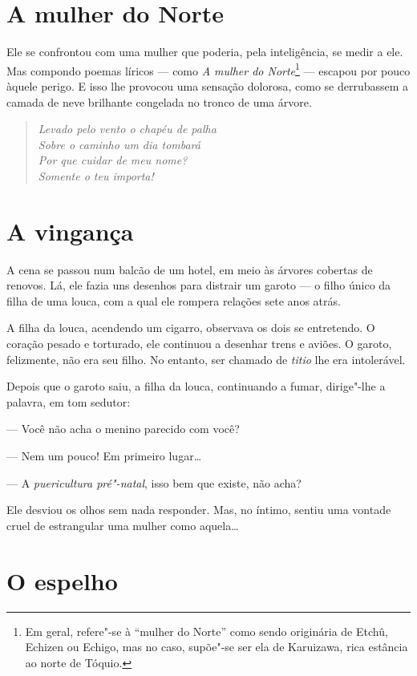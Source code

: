 \section{A mulher do Norte}

Ele se confrontou com uma mulher que poderia, pela inteligência, se
medir a ele. Mas compondo poemas líricos --- como \textit{A mulher do Norte}\footnote{Em geral, refere"-se à ``mulher
do Norte'' como sendo originária de Etchû, Echizen ou Echigo, mas no
caso, supõe"-se ser ela de Karuizawa, rica estância ao norte de Tóquio.} ---
escapou por pouco àquele perigo. E isso lhe provocou uma sensação
dolorosa, como se derrubassem a camada de neve brilhante congelada no
tronco de uma árvore.

\begin{verse}
\textit{Levado pelo vento o chapéu de palha\\
Sobre o caminho um dia tombará\\
Por que cuidar de meu nome?\\
Somente o teu importa!}
\end{verse}

\section{A vingança}

A cena se passou num balcão de um hotel, em meio às árvores cobertas de
renovos. Lá, ele fazia uns desenhos para distrair um garoto --- o filho
único da filha de uma louca, com a qual ele rompera relações sete anos
atrás.

A filha da louca, acendendo um cigarro, observava os dois se entretendo.
O coração pesado e torturado, ele continuou a desenhar trens e aviões.
O garoto, felizmente, não era seu filho. No entanto, ser chamado de
\textit{titio} lhe era intolerável.

Depois que o garoto saiu, a filha da louca, continuando a fumar,
dirige"-lhe a palavra, em tom sedutor:

--- Você não acha o menino parecido com você?

--- Nem um pouco! Em primeiro lugar\ldots{}

--- A \textit{puericultura pré"-natal}, isso bem que existe, não acha?

Ele desviou os olhos sem nada responder. Mas, no íntimo, sentiu uma
vontade cruel de estrangular uma mulher como aquela\ldots{}

\section{O espelho}

